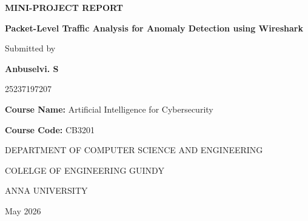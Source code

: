 \documentclass[12pt,a4paper]{article}
\begin{document}
	
	\begin{titlepage}
		
		\centering
		
		\vspace*{1cm}
		
		{\Huge \textbf{MINI-PROJECT REPORT} \par}
		
		\vspace{2cm}
		
		{\LARGE \textbf{Packet-Level Traffic Analysis for Anomaly Detection using Wireshark} \par}
		
		\vspace{3cm}
		
		{\Large Submitted by \par}
		
		\vspace{0.7cm}
		
		{\Large \textbf{Anbuselvi. S } \par}
		
		\vspace{0.3cm}
		
		{\large  25237197207 \par}
		
		\vspace{2cm}
		
		{\Large \textbf{Course Name:} Artificial Intelligence for Cybersecurity \par}
		
		\vspace{0.5cm}
		
		{\Large \textbf{Course Code:} CB3201 \par}
		
		\vfill
		
		\vspace{0.5cm}
		
		{\large DEPARTMENT OF COMPUTER SCIENCE AND ENGINEERING \par}
		{\large COLELGE OF ENGINEERING GUINDY \par}
		{\large ANNA UNIVERSITY  \par}
		
		\vspace{1cm}
		
		{\large May 2026 \par}
		
	\end{titlepage}
	
	
	\vspace{0.5cm}
\end{document}
